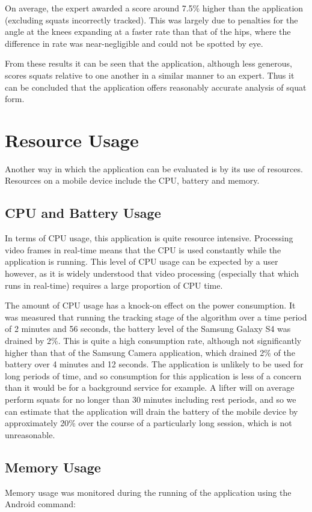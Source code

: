 On average, the expert awarded a score around 7.5\% higher than the application (excluding squats incorrectly tracked). This was largely due to penalties for the angle at the knees expanding at a faster rate than that of the hips, where the difference in rate was near-negligible and could not be spotted by eye.

From these results it can be seen that the application, although less generous, scores squats relative to one another in a similar manner to an expert. Thus it can be concluded that the application offers reasonably accurate analysis of squat form.

\section{Resource Usage}

Another way in which the application can be evaluated is by its use of resources. Resources on a mobile device include the CPU, battery and memory.

\subsection{CPU and Battery Usage}
In terms of CPU usage, this application is quite resource intensive. Processing video frames in real-time means that the CPU is used constantly while the application is running. This level of CPU usage can be expected by a user however, as it is widely understood that video processing (especially that which runs in real-time) requires a large proportion of CPU time.

The amount of CPU usage has a knock-on effect on the power consumption. It was measured that running the tracking stage of the algorithm over a time period of 2 minutes and 56 seconds, the battery level of the Samsung Galaxy S4 was drained by 2\%. This is quite a high consumption rate, although not significantly higher than that of the Samsung Camera application, which drained 2\% of the battery over 4 minutes and 12 seconds. The application is unlikely to be used for long periods of time, and so consumption for this application is less of a concern than it would be for a background service for example. A lifter will on average perform squats for no longer than 30 minutes including rest periods, and so we can estimate that the application will drain the battery of the mobile device by approximately 20\% over the course of a particularly long session, which is not unreasonable.

\subsection{Memory Usage}
Memory usage was monitored during the running of the application using the Android command:

